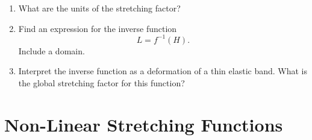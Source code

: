 \documentclass{ximera}
\begin{document}
\begin{question}  \label{Q:LDJJNMDesd}
\begin{enumerate}
\item What are the units of the stretching factor?
\begin{freeResponse}
\end{freeResponse}

\item Find an expression for the inverse function
\[
      L = f^{-1}(H).
\]
Include a domain. 

\item Interpret the inverse function as a deformation of a thin elastic band. What is the global stretching factor for this function?
\begin{freeResponse}
\end{freeResponse}
\end{enumerate}
\end{question}



\section{Non-Linear Stretching Functions}
\end{document}
